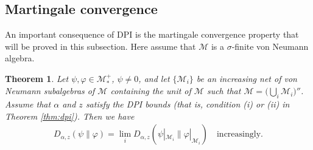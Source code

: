 \documentclass[12pt]{article}
\newtheorem{theorem}{Theorem}[section]
\theoremstyle{definition}
\theoremstyle{remark}
\numberwithin{equation}{section}
\def\cM{\mathcal M}
\def\Me{\mathcal M}
\def\ffi{\varphi}
\begin{document}
\subsection{Martingale convergence}

An important consequence of DPI is the martingale convergence property that will be
proved in this subsection. Here assume that $\cM$ is a $\sigma$-finite von Neumann algebra.

\begin{theorem}\label{thm:martingale}
Let $\psi,\varphi\in \Me_*^+$, $\psi\ne 0$, and let $\{\cM_i\}$ be an increasing net of von Neumann
subalgebras of $\cM$ containing the unit of $\cM$ such that $\cM=\bigl(\bigcup_i\cM_i\bigr)''$.
Assume that $\alpha$ and $z$ satisfy the DPI bounds (that is, condition (i) or (ii) in
Theorem \ref{thm:dpi}). Then we have
\begin{align}\label{eq:martingale}
D_{\alpha,z}(\psi\|\ffi)=\lim_iD_{\alpha,z}(\psi|_{\cM_i}\|\ffi|_{\cM_i})
\quad\mbox{increasingly}.
\end{align}
\end{theorem}
\end{document}
